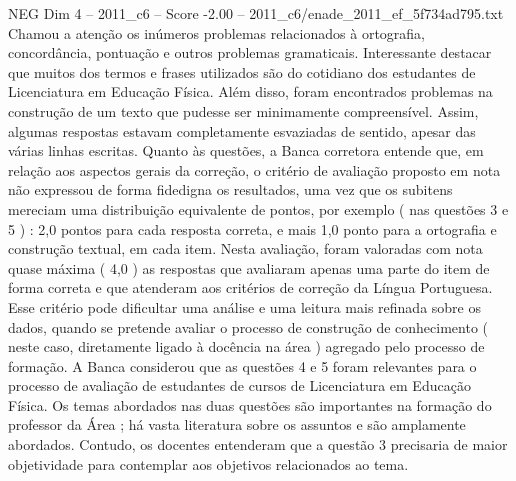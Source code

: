 \begin{textsample}{NEG Dim 4 – 2011\_c6 – Score -2.00 – 2011\_c6/enade\_2011\_ef\_5f734ad795.txt}
Chamou a atenção os inúmeros problemas relacionados à ortografia, concordância, pontuação e outros problemas gramaticais.
Interessante destacar que muitos dos termos e frases utilizados são do cotidiano dos estudantes de Licenciatura em Educação Física.
Além disso, foram encontrados problemas na construção de um texto que pudesse ser minimamente compreensível.
Assim, algumas respostas estavam completamente esvaziadas de sentido, apesar das várias linhas escritas.
Quanto às questões, a Banca corretora entende que, em relação aos aspectos gerais da correção, o critério de avaliação proposto em nota não expressou de forma fidedigna os resultados, uma vez que os subitens mereciam uma distribuição equivalente de pontos, por exemplo ( nas questões 3 e 5 ) : 2,0 pontos para cada resposta correta, e mais 1,0 ponto para a ortografia e construção textual, em cada item.
Nesta avaliação, foram valoradas com nota quase máxima ( 4,0 ) as respostas que avaliaram apenas uma parte do item de forma correta e que atenderam aos critérios de correção da Língua Portuguesa.
Esse critério pode dificultar uma análise e uma leitura mais refinada sobre os dados, quando se pretende avaliar o processo de construção de conhecimento ( neste caso, diretamente ligado à docência na área ) agregado pelo processo de formação.
A Banca considerou que as questões 4 e 5 foram relevantes para o processo de avaliação de estudantes de cursos de Licenciatura em Educação Física.
Os temas abordados nas duas questões são importantes na formação do professor da Área ; há vasta literatura sobre os assuntos e são amplamente abordados.
Contudo, os docentes entenderam que a questão 3 precisaria de maior objetividade para contemplar aos objetivos relacionados ao tema.

\end{textsample}
